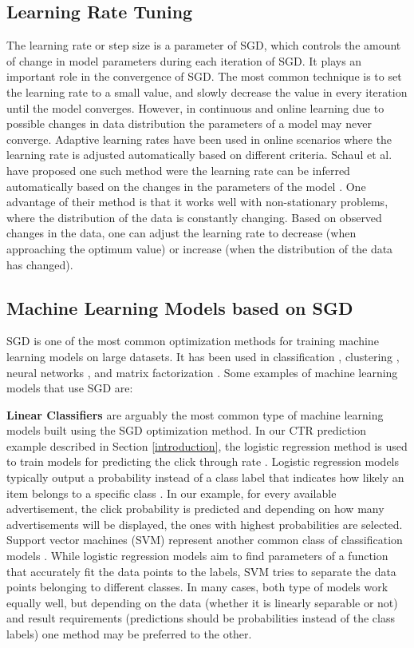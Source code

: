 \documentclass{vldb}
\begin{document}
\subsection{Learning Rate Tuning} \label{learning-rate}
The learning rate or step size is a parameter of SGD, which controls the amount of change in model parameters during each iteration of SGD.
It plays an important role in the convergence of SGD.
The most common technique is to set the learning rate to a small value, and slowly decrease the value in every iteration until the model converges.
However, in continuous and online learning due to possible changes in data distribution the parameters of a model may never converge.
Adaptive learning rates have been used in online scenarios where the learning rate is adjusted automatically based on different criteria.
Schaul et al. have proposed one such method were the learning rate can be inferred automatically based on the changes in the parameters of the model \cite{schaul2013no}. 
One advantage of their method is that it works well with non-stationary problems, where the distribution of the data is constantly changing. 
Based on observed changes in the data, one can adjust the learning rate to decrease (when approaching the optimum value) or increase (when the distribution of the data has changed).

\subsection{Machine Learning Models based on SGD}
SGD is one of the most common optimization methods for training machine learning models on large datasets. 
It has been used in classification \cite{zhang2004solving}, clustering \cite{bottou1995convergence}, neural networks \cite{dean2012large}, and matrix factorization \cite{funk2006netflix}.
Some examples of machine learning models that use SGD are: 

\textbf{Linear Classifiers} are arguably the most common type of machine learning models built using the SGD optimization method. 
In our CTR prediction example described in Section \ref{introduction}, the logistic regression method is used to train models for predicting the click through rate \cite{macmahan2013}. 
Logistic regression models typically output a probability instead of a class label that indicates how likely an item belongs to a specific class \cite{hosmer2013applied}.
In our example, for every available advertisement, the click probability is predicted and depending on how many advertisements will be displayed, the ones with highest probabilities are selected.
Support vector machines (SVM) represent another common class of classification models \cite{steinwart2008support}.
While logistic regression models aim to find parameters of a function that accurately fit the data points to the labels, SVM tries to separate the data points belonging to different classes. 
In many cases, both type of models work equally well, but depending on the data (whether it is linearly separable or not) and result requirements (predictions should be probabilities instead of the class labels) one method may be preferred to the other.
\end{document}
